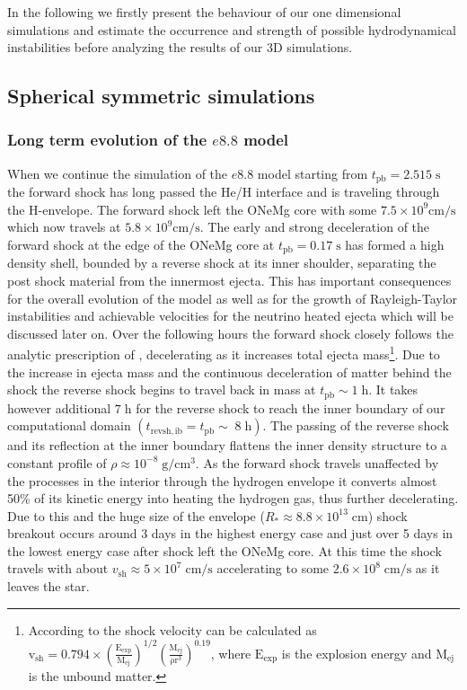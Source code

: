 \documentclass[fleqn,usenatbib]{mnras}
\begin{document}
In the following we firstly present the behaviour of our one dimensional simulations and estimate the occurrence and strength of possible hydrodynamical instabilities before analyzing the results of our 3D simulations.

\subsection{Spherical symmetric simulations}
\subsubsection{Long term evolution of the $e8.8$ model}

When we continue the simulation of the $e8.8$ model starting from $t_{\mathrm{pb}}=2.515\;\mathrm{s}$ the forward shock has long passed the He/H interface and is traveling through the H-envelope. The forward shock left the ONeMg core with some $7.5\times 10^{9}\mathrm{cm/s}$ which now travels at $5.8\times 10^{9}\mathrm{cm/s}$. The early and strong deceleration of the forward shock at the edge of the ONeMg core at $t_{\mathrm{pb}}=0.17\;\mathrm{s}$ has formed a high density shell, bounded by a reverse shock at its inner shoulder, separating the post shock material from the innermost ejecta.  
This has important consequences for the overall evolution of the model as well as for the growth of Rayleigh-Taylor instabilities and achievable velocities for the neutrino heated ejecta which will be discussed later on.
Over the following hours the forward shock closely follows the analytic prescription of \citet{Matzner1998}, decelerating as it increases total ejecta mass\footnote{According to \citet{Matzner1998} the shock velocity can be calculated as $\mathrm{v_{sh}=0.794\times(\frac{E_{exp}}{M_{ej}})^{1/2}(\frac{M_{ej}}{\rho r^3})^{0.19}}$, where $\mathrm{E_{exp}}$ is the explosion energy and $\mathrm{M_{ej}}$ is the unbound matter.}. Due to the increase in ejecta mass and the continuous deceleration of matter behind the shock  the reverse shock begins to travel back in mass at  $t_{\mathrm{pb}}\sim 1\;\mathrm{h}$. It takes however additional $7\;\mathrm{h}$ for the reverse shock to reach the inner boundary of our computational domain $(t_{\mathrm{revsh,ib}}=t_{\mathrm{pb}}\sim \; 8\;\mathrm{h})$. The passing of the reverse shock and its reflection at the inner boundary flattens the inner density structure to a constant profile of $\rho\approx 10^{-8}\;\mathrm{g/cm^3}$.
As the forward shock travels unaffected by the processes in the interior through the hydrogen envelope it converts almost 50\% of its kinetic energy into heating the hydrogen gas, thus further decelerating. Due to this and the huge size of the envelope ($R_{*}\approx8.8\times10^{13}\;\mathrm{cm}$) shock breakout occurs around 3 days in the highest energy case and just over 5 days in the lowest energy case after shock left the ONeMg core. At this time the shock travels with about $v_{\mathrm{sh}}\approx 5\times 10^{7}\; \mathrm{cm/s}$ accelerating to some $2.6\times 10^{8}\; \mathrm{cm/s}$ as it leaves the star.
\end{document}
